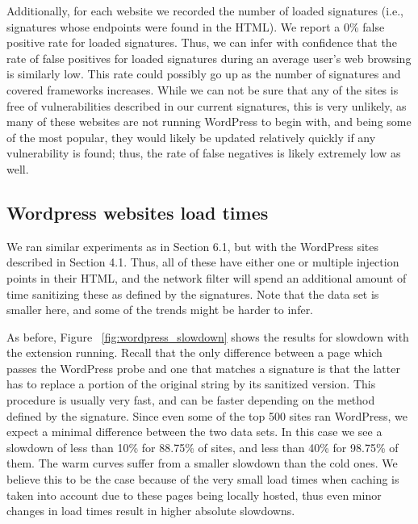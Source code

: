 
Additionally, for each website we recorded the number of loaded signatures (i.e., signatures whose endpoints were found in the HTML). We report a 0\% false positive rate for loaded signatures. Thus, we can infer with confidence that the rate of false positives for loaded signatures during an average user's web browsing is similarly low. This rate could possibly go up as the number of signatures and covered frameworks increases. While we can not be sure that any of the sites is free of vulnerabilities described in our current signatures, this is very unlikely, as many of these websites are not running WordPress to begin with, and being some of the most popular, they would likely be updated relatively quickly if any vulnerability is found; thus, the rate of false negatives is likely extremely low as well.

\subsection{Wordpress websites load times} \label{wordpress_sites}

We ran similar experiments as in Section 6.1, but with the WordPress sites described in Section 4.1. Thus, all of these have either one or multiple injection points in their HTML, and the network filter will spend an additional amount of time sanitizing these as defined by the signatures. Note that the data set is smaller here, and some of the trends might be harder to infer. 

As before, Figure ~\ref{fig:wordpress_slowdown} shows the results for slowdown with the extension running. Recall that the only difference between a page which passes the WordPress probe and one that matches a signature is that the latter has to replace a portion of the original string by its sanitized version. This procedure is usually very fast, and can be faster depending on the method defined by the signature. Since even some of the top 500 sites ran WordPress, we expect a minimal difference between the two data sets. In this case we see a slowdown of less than 10\% for 88.75\% of sites, and less than 40\% for 98.75\% of them. The warm curves suffer from a smaller slowdown than the cold ones. We believe this to be the case because of the very small load times when caching is taken into account due to these pages being locally hosted, thus even minor changes in load times result in higher absolute slowdowns.

